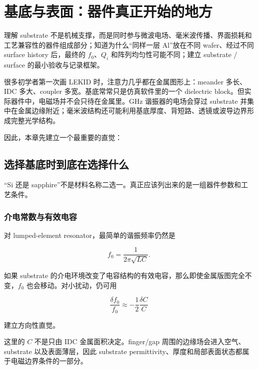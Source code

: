 \chapter{基底与表面：器件真正开始的地方}

\begin{chaptergoal}
理解 substrate 不是机械支撑，而是同时参与微波电场、毫米波传播、界面损耗和工艺兼容性的器件组成部分；知道为什么“同样一层 Al”放在不同 wafer、经过不同 surface history 后，最终的 $f_0$、$Q_i$ 和阵列均匀性可能不同；建立 substrate / surface 的最小验收与记录框架。
\end{chaptergoal}

很多初学者第一次画 LEKID 时，注意力几乎都在金属图形上：meander 多长、IDC 多大、coupler 多宽。基底常常只是仿真软件里的一个 dielectric block。但实际器件中，电磁场并不会只待在金属里。GHz 谐振器的电场会穿过 substrate 并集中在金属边缘附近；毫米波结构还可能利用基底厚度、背短路、透镜或波导边界形成完整光学结构。

因此，本章先建立一个最重要的直觉：


\section{选择基底时到底在选择什么}

“Si 还是 sapphire”不是材料名称二选一。真正应该列出来的是一组器件参数和工艺条件。

\subsection{介电常数与有效电容}

对 lumped-element resonator，最简单的谐振频率仍然是

\[
f_0=\frac{1}{2\pi\sqrt{LC}}.
\]

如果 substrate 的介电环境改变了电容结构的有效电容，那么即使金属版图完全不变，$f_0$ 也会移动。对小扰动，仍可用

\[
\frac{\delta f_0}{f_0}\approx -\frac{1}{2}\frac{\delta C}{C}
\]

建立方向性直觉。

这里的 $C$ 不是只由 IDC 金属面积决定。finger/gap 周围的边缘场会进入空气、substrate 以及表面薄层，因此 substrate permittivity、厚度和局部表面状态都属于电磁边界条件的一部分。

